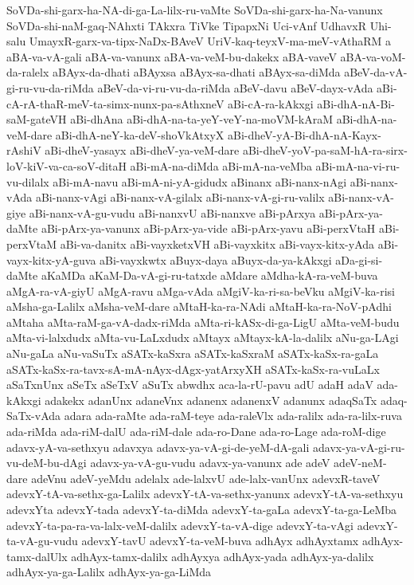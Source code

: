 {SoVDa-shi-garx-ha-NA-di-ga-La-lilx-ru-vaMte
SoVDa-shi-garx-ha-Na-vanunx
SoVDa-shi-naM-gaq-NAhxti
TAkxra
TiVke
TipapxNi
Uci-vAnf
UdhavxR
Uhi-salu
UmayxR-garx-va-tipx-NaDx-BAveV
UriV-kaq-teyxV-ma-meV-vAthaRM
a
aBA-va-vA-gali
aBA-va-vanunx
aBA-va-veM-bu-dakekx
aBA-vaveV
aBA-va-voM-da-ralelx
aBAyx-da-dhati
aBAyxsa
aBAyx-sa-dhati
aBAyx-sa-diMda
aBeV-da-vA-gi-ru-vu-da-riMda
aBeV-da-vi-ru-vu-da-riMda
aBeV-davu
aBeV-dayx-vAda
aBi-cA-rA-thaR-meV-ta-simx-nunx-pa-sAthxneV
aBi-cA-ra-kAkxgi
aBi-dhA-nA-Bi-saM-gateVH
aBi-dhAna
aBi-dhA-na-ta-yeY-veY-na-moVM-kAraM
aBi-dhA-na-veM-dare
aBi-dhA-neY-ka-deV-shoVkAtxyX
aBi-dheV-yA-Bi-dhA-nA-Kayx-rAshiV
aBi-dheV-yasayx
aBi-dheV-ya-veM-dare
aBi-dheV-yoV-pa-saM-hA-ra-sirx-loV-kiV-va-ca-soV-ditaH
aBi-mA-na-diMda
aBi-mA-na-veMba
aBi-mA-na-vi-ru-vu-dilalx
aBi-mA-navu
aBi-mA-ni-yA-gidudx
aBinanx
aBi-nanx-nAgi
aBi-nanx-vAda
aBi-nanx-vAgi
aBi-nanx-vA-gilalx
aBi-nanx-vA-gi-ru-valilx
aBi-nanx-vA-giye
aBi-nanx-vA-gu-vudu
aBi-nanxvU
aBi-nanxve
aBi-pArxya
aBi-pArx-ya-daMte
aBi-pArx-ya-vanunx
aBi-pArx-ya-vide
aBi-pArx-yavu
aBi-perxVtaH
aBi-perxVtaM
aBi-va-danitx
aBi-vayxketxVH
aBi-vayxkitx
aBi-vayx-kitx-yAda
aBi-vayx-kitx-yA-guva
aBi-vayxkwtx
aBuyx-daya
aBuyx-da-ya-kAkxgi
aDa-gi-si-daMte
aKaMDa
aKaM-Da-vA-gi-ru-tatxde
aMdare
aMdha-kA-ra-veM-buva
aMgA-ra-vA-giyU
aMgA-ravu
aMga-vAda
aMgiV-ka-ri-sa-beVku
aMgiV-ka-risi
aMsha-ga-Lalilx
aMsha-veM-dare
aMtaH-ka-ra-NAdi
aMtaH-ka-ra-NoV-pAdhi
aMtaha
aMta-raM-ga-vA-dadx-riMda
aMta-ri-kASx-di-ga-LigU
aMta-veM-budu
aMta-vi-lalxdudx
aMta-vu-LaLxdudx
aMtayx
aMtayx-kA-la-dalilx
aNu-ga-LAgi
aNu-gaLa
aNu-vaSuTx
aSATx-kaSxra
aSATx-kaSxraM
aSATx-kaSx-ra-gaLa
aSATx-kaSx-ra-tavx-sA-mA-nAyx-dAgx-yatArxyXH
aSATx-kaSx-ra-vuLaLx
aSaTxnUnx
aSeTx
aSeTxV
aSuTx
abwdhx
aca-la-rU-pavu
adU
adaH
adaV
ada-kAkxgi
adakekx
adanUnx
adaneVnx
adanenx
adanenxV
adanunx
adaqSaTx
adaq-SaTx-vAda
adara
ada-raMte
ada-raM-teye
ada-raleVlx
ada-ralilx
ada-ra-lilx-ruva
ada-riMda
ada-riM-dalU
ada-riM-dale
ada-ro-Dane
ada-ro-Lage
ada-roM-dige
adavx-yA-va-sethxyu
adavxya
adavx-ya-vA-gi-de-yeM-dA-gali
adavx-ya-vA-gi-ru-vu-deM-bu-dAgi
adavx-ya-vA-gu-vudu
adavx-ya-vanunx
ade
adeV
adeV-neM-dare
adeVnu
adeV-yeMdu
adelalx
ade-lalxvU
ade-lalx-vanUnx
adevxR-taveV
adevxY-tA-va-sethx-ga-Lalilx
adevxY-tA-va-sethx-yanunx
adevxY-tA-va-sethxyu
adevxYta
adevxY-tada
adevxY-ta-diMda
adevxY-ta-gaLa
adevxY-ta-ga-LeMba
adevxY-ta-pa-ra-va-lalx-veM-dalilx
adevxY-ta-vA-dige
adevxY-ta-vAgi
adevxY-ta-vA-gu-vudu
adevxY-tavU
adevxY-ta-veM-buva
adhAyx
adhAyxtamx
adhAyx-tamx-dalUlx
adhAyx-tamx-dalilx
adhAyxya
adhAyx-yada
adhAyx-ya-dalilx
adhAyx-ya-ga-Lalilx
adhAyx-ya-ga-LiMda
}
